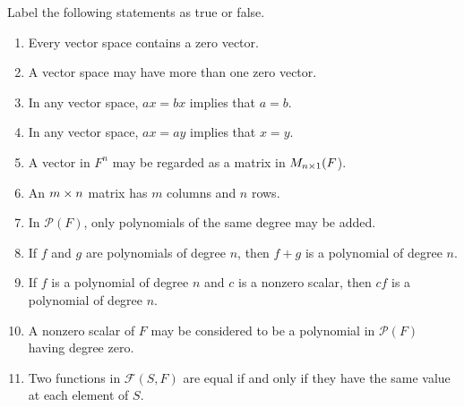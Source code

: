 \exercisesection

\begin{exercise} \label{exercise 1.2.1}
Label the following statements as true or false.
\begin{enumerate}
\item Every vector space contains a zero vector.
\item A vector space may have more than one zero vector.
\item In any vector space, \(ax = bx\) implies that \(a = b\).
\item In any vector space, \(ax = ay\) implies that \(x = y\).
\item A vector in \(F^n\) may be regarded as a matrix in \(M_{n \times 1}(F \)).
\item An \(m \times n\) matrix has \(m\) columns and \(n\) rows.
\item In \(\mathcal{P}(F)\), only polynomials of the same degree may be added.
\item If \(f\) and \(g\) are polynomials of degree \(n\), then \(f + g\) is a polynomial of degree \(n\).
\item If \(f\) is a polynomial of degree \(n\) and \(c\) is a nonzero scalar, then \(cf\) is a polynomial of degree \(n\).
\item A nonzero scalar of \(F\) may be considered to be a polynomial in \(\mathcal{P}(F)\) having degree zero.
\item Two functions in \(\mathcal{F}(S, F)\) are equal if and only if they have the same value at each element of \(S\).
\end{enumerate}
\end{exercise}

